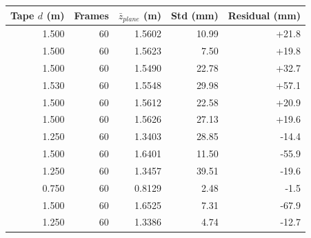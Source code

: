 \begin{tabular}{@{}rrrrr@{}}\toprule
Tape $d$ (m) & Frames & $\bar z_{plane}$ (m) & Std (mm) & Residual (mm)\\\midrule
1.500 & 60 & 1.5602 & 10.99 & +21.8\\
1.500 & 60 & 1.5623 & 7.50 & +19.8\\
1.500 & 60 & 1.5490 & 22.78 & +32.7\\
1.530 & 60 & 1.5548 & 29.98 & +57.1\\
1.500 & 60 & 1.5612 & 22.58 & +20.9\\
1.500 & 60 & 1.5626 & 27.13 & +19.6\\
1.250 & 60 & 1.3403 & 28.85 & -14.4\\
1.500 & 60 & 1.6401 & 11.50 & -55.9\\
1.250 & 60 & 1.3457 & 39.51 & -19.6\\
0.750 & 60 & 0.8129 & 2.48 & -1.5\\
1.500 & 60 & 1.6525 & 7.31 & -67.9\\
1.250 & 60 & 1.3386 & 4.74 & -12.7\\
\bottomrule\end{tabular}
